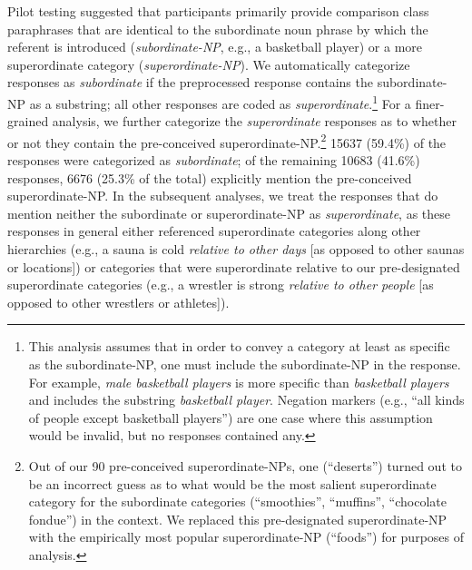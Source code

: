 \documentclass[doc]{apa6}
\begin{document}


Pilot testing suggested that participants primarily provide comparison class paraphrases that are identical to the subordinate noun phrase by which the referent is introduced (\emph{subordinate-NP}, e.g., a basketball player) or a more superordinate category (\emph{superordinate-NP}).
We automatically categorize responses as \emph{subordinate} if the preprocessed response contains the subordinate-NP as a substring; all other responses are coded as \emph{superordinate}.\footnote{This analysis assumes that in order to convey a category at least as specific as the subordinate-NP, one must include the subordinate-NP in the response. For example, \emph{male basketball players} is more specific than \emph{basketball players} and includes the substring \emph{basketball player}. Negation markers (e.g., ``all kinds of people except basketball players'') are one case where this assumption would be invalid, but no responses contained any.}
For a finer-grained analysis, we further categorize the \emph{superordinate} responses as to whether or not they contain the pre-conceived superordinate-NP.\footnote{Out of our 90 pre-conceived superordinate-NPs, one (``deserts'') turned out to be an incorrect guess as to what would be the most salient superordinate category for the subordinate categories (``smoothies'', ``muffins'', ``chocolate fondue'') in the context. We replaced this pre-designated superordinate-NP with the empirically most popular superordinate-NP (``foods'') for purposes of analysis.}
15637 (59.4\%) of the responses were categorized as \emph{subordinate}; of the remaining 10683 (41.6\%) responses, 6676 (25.3\% of the total) explicitly mention the pre-conceived superordinate-NP.
In the subsequent analyses, we treat the responses that do mention neither the subordinate or superordinate-NP as \emph{superordinate}, as these responses in general either referenced superordinate categories along other hierarchies (e.g., a sauna is cold \emph{relative to other days} [as opposed to other saunas or locations]) or categories that were superordinate relative to our pre-designated superordinate categories (e.g., a wrestler is strong \emph{relative to other people} [as opposed to other wrestlers or athletes]).
\end{document}
